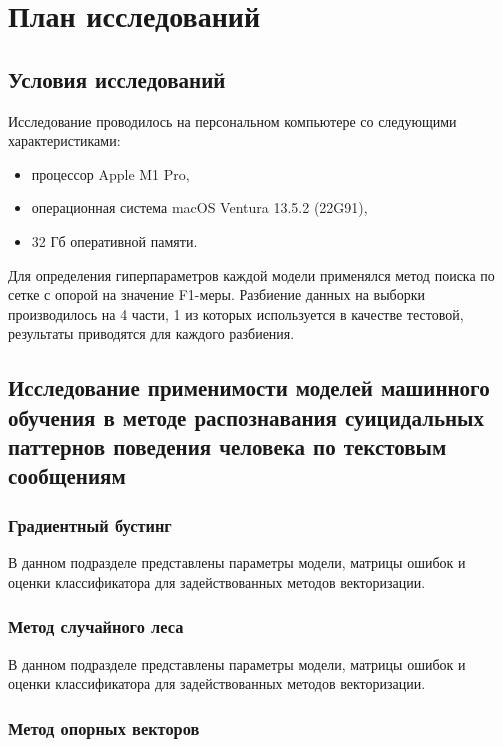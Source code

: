 \section{План исследований}
\subsection{Условия исследований}
Исследование проводилось на персональном компьютере со следующими характеристиками:

\begin{itemize}
\item процессор Apple M1 Pro,
\item операционная система macOS Ventura 13.5.2 (22G91),
\item 32 Гб оперативной памяти.
\end{itemize}

Для определения гиперпараметров каждой модели применялся метод поиска по сетке с опорой на значение F1-меры. Разбиение данных на выборки производилось на 4 части, 1 из которых используется в качестве тестовой, результаты приводятся для каждого разбиения.

\subsection{Исследование применимости моделей машинного обучения в методе распознавания суицидальных паттернов поведения человека по текстовым сообщениям}

\subsubsection{Градиентный бустинг}

В данном подразделе представлены параметры модели, матрицы ошибок и оценки классификатора для задействованных методов векторизации.


\subsubsection{Метод случайного леса }

В данном подразделе представлены параметры модели, матрицы ошибок и оценки классификатора для задействованных методов векторизации.


\subsubsection{Метод опорных векторов }

